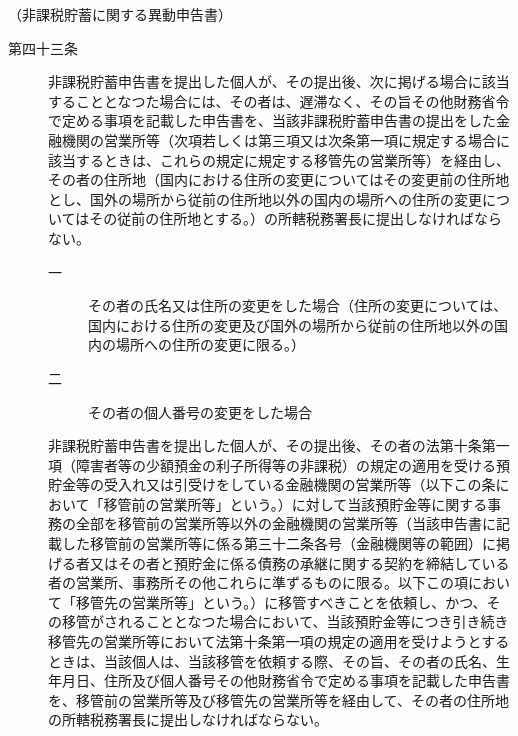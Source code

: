 \documentclass[twocolumn,a4j,10pt]{ltjtarticle}
\begin{document}
\noindent\hspace{10pt}（非課税貯蓄に関する異動申告書）
\begin{description}
\item[第四十三条]非課税貯蓄申告書を提出した個人が、その提出後、次に掲げる場合に該当することとなつた場合には、その者は、遅滞なく、その旨その他財務省令で定める事項を記載した申告書を、当該非課税貯蓄申告書の提出をした金融機関の営業所等（次項若しくは第三項又は次条第一項に規定する場合に該当するときは、これらの規定に規定する移管先の営業所等）を経由し、その者の住所地（国内における住所の変更についてはその変更前の住所地とし、国外の場所から従前の住所地以外の国内の場所への住所の変更についてはその従前の住所地とする。）の所轄税務署長に提出しなければならない。
\begin{description}
\item[一]その者の氏名又は住所の変更をした場合（住所の変更については、国内における住所の変更及び国外の場所から従前の住所地以外の国内の場所への住所の変更に限る。）
\item[二]その者の個人番号の変更をした場合
\end{description}
\item[]非課税貯蓄申告書を提出した個人が、その提出後、その者の法第十条第一項（障害者等の少額預金の利子所得等の非課税）の規定の適用を受ける預貯金等の受入れ又は引受けをしている金融機関の営業所等（以下この条において「移管前の営業所等」という。）に対して当該預貯金等に関する事務の全部を移管前の営業所等以外の金融機関の営業所等（当該申告書に記載した移管前の営業所等に係る第三十二条各号（金融機関等の範囲）に掲げる者又はその者と預貯金に係る債務の承継に関する契約を締結している者の営業所、事務所その他これらに準ずるものに限る。以下この項において「移管先の営業所等」という。）に移管すべきことを依頼し、かつ、その移管がされることとなつた場合において、当該預貯金等につき引き続き移管先の営業所等において法第十条第一項の規定の適用を受けようとするときは、当該個人は、当該移管を依頼する際、その旨、その者の氏名、生年月日、住所及び個人番号その他財務省令で定める事項を記載した申告書を、移管前の営業所等及び移管先の営業所等を経由して、その者の住所地の所轄税務署長に提出しなければならない。

\end{description}
\end{document}
